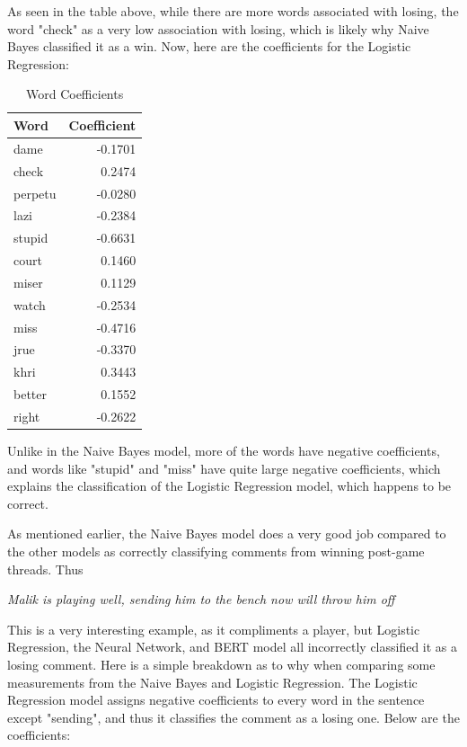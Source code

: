\documentclass[twocolumn]{article}
\begin{document}
As seen in the table above, while there are more words associated with losing, the word "check" as a very low association with losing, which is likely why Naive Bayes classified it as a win. Now, here are the coefficients for the Logistic Regression:

\begin{table}[H]
\centering
\begin{tabular}{l r}
\hline
Word & Coefficient \\
\hline
dame & -0.1701 \\
check & 0.2474 \\
perpetu & -0.0280 \\
lazi & -0.2384 \\
stupid & -0.6631 \\
court & 0.1460 \\
miser & 0.1129 \\
watch & -0.2534 \\
miss & -0.4716 \\
jrue & -0.3370 \\
khri & 0.3443 \\
better & 0.1552 \\
right & -0.2622 \\
\hline
\end{tabular}
\caption{Word Coefficients}
\label{tab:word_coefficients}
\end{table}

Unlike in the Naive Bayes model, more of the words have negative coefficients, and words like "stupid" and "miss" have quite large negative coefficients, which explains the classification of the Logistic Regression model, which happens to be correct.

As mentioned earlier, the Naive Bayes model does a very good job compared to the other models as correctly classifying comments from winning post-game threads. Thus

\begin{center}
\textit{Malik is playing well, sending him to the bench now will throw him off}
\end{center}

This is a very interesting example, as it compliments a player, but Logistic Regression, the Neural Network, and BERT model all incorrectly classified it as a losing comment. Here is a simple breakdown as to why when comparing some measurements from the Naive Bayes and Logistic Regression. The Logistic Regression model assigns negative coefficients to every word in the sentence except "sending", and thus it classifies the comment as a losing one. Below are the coefficients:
\end{document}
